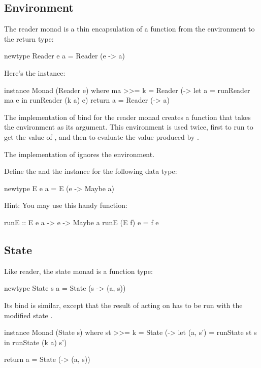 \documentclass[DaoFP]{subfiles}
\begin{document}
\subsection{Environment}

The reader monad is a thin encapsulation of a function from the environment to the return type:
\begin{haskell}
newtype Reader e a = Reader (e -> a)
\end{haskell}
Here's the  instance:
\begin{haskell}
instance Monad (Reader e) where
  ma >>= k = Reader (\e -> let a = runReader ma e
                           in runReader (k a) e)
  return a = Reader (\e -> a)
\end{haskell}
The implementation of bind for the reader monad creates a function that takes the environment as its argument. This environment is used twice, first to run  to get the value of , and then to evaluate the value produced by .

The implementation of  ignores the environment.

\begin{exercise}
Define the  and the  instance for the following data type:
\begin{haskell}
newtype E e a = E (e -> Maybe a)
\end{haskell}
Hint: You may use this handy function:
\begin{haskell}
runE :: E e a -> e -> Maybe a
runE (E f) e = f e
\end{haskell}
\end{exercise}


\subsection{State}
Like reader, the state monad is a function type:
\begin{haskell}
newtype State s a = State (s -> (a, s))
\end{haskell}
Its bind is similar, except that the result of  acting on   has to be run with the modified state .
\begin{haskell}
instance Monad (State s) where
  st >>= k = State (\s -> let (a, s') = runState st s
                          in runState (k a) s')
                          
  return a = State (\s -> (a, s))
\end{haskell}
\end{document}
